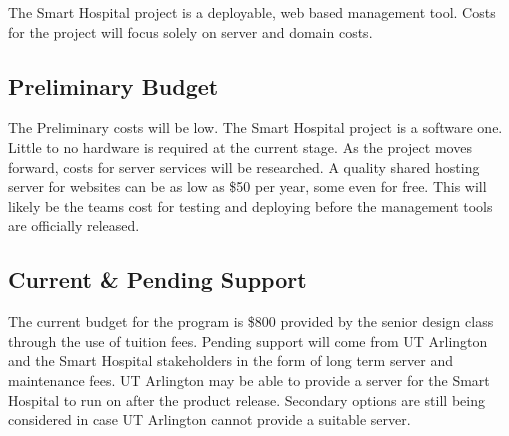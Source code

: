 The Smart Hospital project is a deployable, web based management tool. Costs for the project will focus solely on server and domain costs.

\subsection{Preliminary Budget}
The Preliminary costs will be low. The Smart Hospital project is a software one. Little to no hardware is required at the current stage. As the project moves forward, costs for server services will be researched. A quality shared hosting server for websites can be as low as \$50 per year, some even for free. This will likely be the teams cost for testing and deploying before the management tools are officially released. 

\subsection{Current \& Pending Support}
The current budget for the program is \$800 provided by the senior design class through the use of tuition fees. Pending support will come from UT Arlington and the Smart Hospital stakeholders in the form of long term server and maintenance fees. UT Arlington may be able to provide a server for the Smart Hospital to run on after the product release. Secondary options are still being considered in case UT Arlington cannot provide a suitable server.
